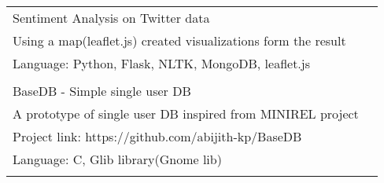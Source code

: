 \documentclass[a4paper,10pt]{article} %
\begin{document}
\begin{tabular}{p{15cm}p{9cm}}	
%

        \textsf{Sentiment Analysis on Twitter data} &  \\
        \textsf{Using a map(leaflet.js) created visualizations form the result}                  & \\
        \textsf{Language: Python, Flask, NLTK, MongoDB, leaflet.js}                                                 & \\
                                                                              & \\

        \textsf{BaseDB - Simple single user DB} &  \\
        \textsf{A prototype of single user DB inspired from MINIREL project}                  & \\
        \textsf{Project link: https://github.com/abijith-kp/BaseDB}                  & \\
        \textsf{Language: C, Glib library(Gnome lib)}                                                 & \\
                                                                              & \\


\end{tabular}
\end{document}

